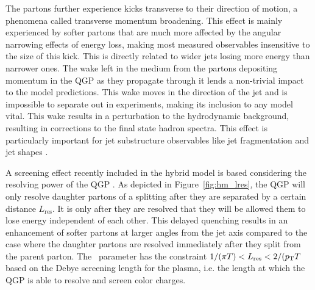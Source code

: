 The partons further experience kicks transverse to their direction of motion, a phenomena called transverse momentum broadening. This effect is mainly experienced by softer partons that are much more affected by the angular narrowing effects of energy loss, making most measured observables insensitive to the size of this kick. This is directly related to wider jets losing more energy than narrower ones. The wake left in the medium from the partons depositing momentum in the QGP as they propagate through it lends a non-trivial impact to the model predictions. This wake moves in the direction of the jet and is impossible to separate out in experiments, making its inclusion to any model vital. This wake results in a perturbation to the hydrodynamic background, resulting in corrections to the final state hadron spectra. This effect is particularly important for jet substructure observables like jet fragmentation and jet shapes \cite{Casalderrey-Solana:2016jvj}.

A screening effect recently included in the hybrid model is based considering the resolving power of the QGP \cite{Hulcher:2017cpt}. As depicted in Figure~\ref{fig:hm_lres}, the QGP will only resolve daughter partons of a splitting after they are separated by a certain distance $L_\mathrm{res}$. It is only after they are resolved that they will be allowed them to lose energy independent of each other. This delayed quenching results in an enhancement of softer partons at larger angles from the jet axis compared to the case where the daughter partons are resolved immediately after they split from the parent parton. The \Lres\ parameter has the constraint $ 1/(\pi T) < \mbox{$L_{\mathrm{res}}$} < 2 /(\mbox{$p_{\mathrm{T}}$} T$ based on the Debye screening length for the plasma, i.e. the length at which the QGP is able to resolve and screen color charges.


